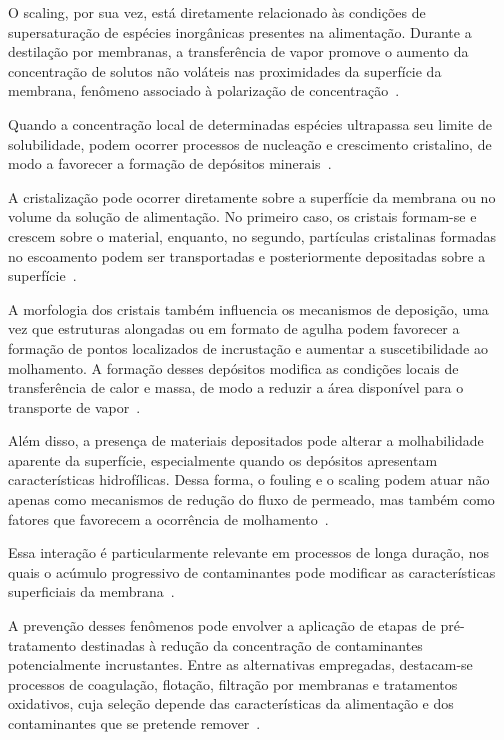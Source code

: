 O scaling, por sua vez, está diretamente relacionado às condições de supersaturação de espécies inorgânicas presentes na alimentação. Durante a destilação por membranas, a transferência de vapor promove o aumento da concentração de solutos não voláteis nas proximidades da superfície da membrana, fenômeno associado à polarização de concentração~\cite{AbdelKarim2021,Hsieh2024ScalingWetting}.

Quando a concentração local de determinadas espécies ultrapassa seu limite de solubilidade, podem ocorrer processos de nucleação e crescimento cristalino, de modo a favorecer a formação de depósitos minerais~\cite{AbdelKarim2021,Hsieh2024ScalingWetting}.

A cristalização pode ocorrer diretamente sobre a superfície da membrana ou no volume da solução de alimentação. No primeiro caso, os cristais formam-se e crescem sobre o material, enquanto, no segundo, partículas cristalinas formadas no escoamento podem ser transportadas e posteriormente depositadas sobre a superfície~\cite{AbdelKarim2021,Hsieh2024ScalingWetting}. 

A morfologia dos cristais também influencia os mecanismos de deposição, uma vez que estruturas alongadas ou em formato de agulha podem favorecer a formação de pontos localizados de incrustação e aumentar a suscetibilidade ao molhamento. A formação desses depósitos modifica as condições locais de transferência de calor e massa, de modo a reduzir a área disponível para o transporte de vapor~\cite{AbdelKarim2021,Hsieh2024ScalingWetting}.

Além disso, a presença de materiais depositados pode alterar a molhabilidade aparente da superfície, especialmente quando os depósitos apresentam características hidrofílicas. Dessa forma, o fouling e o scaling podem atuar não apenas como mecanismos de redução do fluxo de permeado, mas também como fatores que favorecem a ocorrência de molhamento~\cite{AbdelKarim2021,Hsieh2024ScalingWetting}.

Essa interação é particularmente relevante em processos de longa duração, nos quais o acúmulo progressivo de contaminantes pode modificar as características superficiais da membrana~\cite{AbdelKarim2021,Hsieh2024ScalingWetting}. 

A prevenção desses fenômenos pode envolver a aplicação de etapas de pré-tratamento destinadas à redução da concentração de contaminantes potencialmente incrustantes. Entre as alternativas empregadas, destacam-se processos de coagulação, flotação, filtração por membranas e tratamentos oxidativos, cuja seleção depende das características da alimentação e dos contaminantes que se pretende remover~\cite{AbdelKarim2021,Hsieh2021Pretreatments}.

